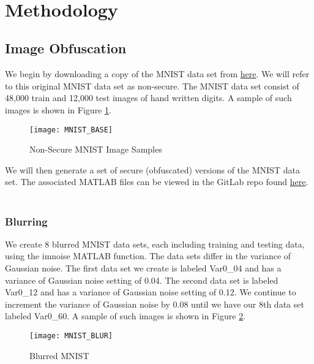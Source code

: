 \documentclass[12pt, titlepage]{article}
\begin{document}
~\newpage
\section{Methodology}\label{Methodology}

\subsection{Image Obfuscation}

\noindent We begin by downloading a copy of the MNIST data set from \href{http://yann.lecun.com/exdb/mnist/}{here}. 
We will refer to this original MNIST data set as non-secure. The MNIST data set consist of 48,000 train and 12,000 test images of hand written digits. A sample of such images is shown in Figure \ref{MNIST_BASE}.\\ 

\begin{figure}[h!]
	\begin{center}
		\texttt{[image: MNIST\_BASE]}
		\caption{Non-Secure MNIST Image Samples}
		\label{MNIST_BASE}
	\end{center}
\end{figure}

\noindent We will then generate a set of secure (obfuscated) versions of the MNIST data set. The associated MATLAB files can be viewed in the GitLab repo found \href{https://github.com/peter-michalski/CAS771/tree/master/MATLAB}{here}.\\

~\newpage
\subsubsection{Blurring}\label{BlurringMethodology}

We create 8 blurred MNIST data sets, each including training and testing data, using the imnoise MATLAB function. The data sets differ in the variance of Gaussian noise. The first data set we create is labeled Var0\_04 and has a variance of Gaussian noise setting of 0.04. The second data set is labeled Var0\_12 and has a variance of Gaussian noise setting of 0.12. We continue to increment the variance of Gaussian noise by 0.08 until we have our 8th data set labeled Var0\_60. A sample of such images is shown in Figure \ref{MNIST_BLURRED}.\\

 \begin{figure}[h!]
	\begin{center}
		\texttt{[image: MNIST\_BLUR]}
		\caption{Blurred MNIST}
		\label{MNIST_BLURRED}
	\end{center}
\end{figure}
\end{document}
